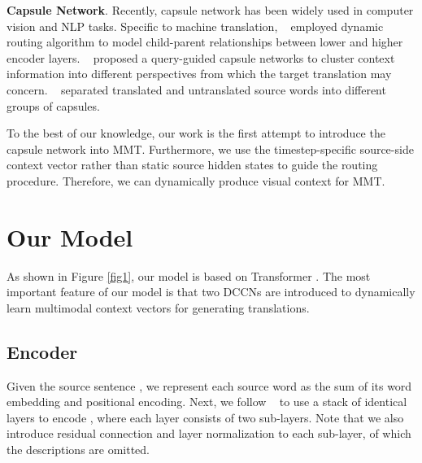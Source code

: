 \documentclass[sigconf]{acmart}
\begin{document}
\textbf{Capsule Network}.
Recently, capsule network has been widely used in computer vision 
\cite{DBLP:conf/iclr/XinyiC19,DBLP:conf/eccv/LiGDOW18,DBLP:conf/iccv/SinghN0V19,DBLP:journals/spl/XiangZTZX18,DBLP:conf/eccv/JaiswalA0N18,DBLP:journals/corr/abs-1812-00303} 
and NLP \cite{DBLP:conf/iclr/XinyiC19,chen2019transfer,yang-etal-2018-investigating,aly2019hierarchical} tasks. 
Specific to machine translation, \citeauthor{DBLP:conf/emnlp/Wang19}~ employed dynamic routing algorithm to model child-parent relationships between lower and higher encoder layers. 
\citeauthor{DBLP:conf/emnlp/YangZMGFZ19}~ proposed a query-guided capsule networks to cluster context information into  different perspectives from which the target translation may concern. 
\citeauthor{DBLP:conf/emnlp/ZhengHTDC19}~ separated translated and untranslated source words into different groups of capsules. 

To the best of our knowledge, 
our work is the first attempt to introduce the capsule network into MMT. 
Furthermore, 
we use the timestep-specific source-side context vector rather than static source hidden states to guide the routing procedure. 
Therefore, we can dynamically produce visual context for MMT. 





\section{Our Model}
As shown in Figure \ref{fig1}, our model is based on Transformer \cite{vaswani2017attention}. 
The most important feature of our model is that two DCCNs are introduced to dynamically learn multimodal context vectors for  generating translations.



\subsection{Encoder}

Given the source sentence , 
we represent each source word as the sum of its word embedding and positional encoding. 
Next, 
we follow \citeauthor{vaswani2017attention}~ to use a stack of  identical layers to encode , 
where each layer consists of two sub-layers. 
Note that we also introduce residual connection and layer normalization to each sub-layer, of which the descriptions are omitted.
\end{document}
